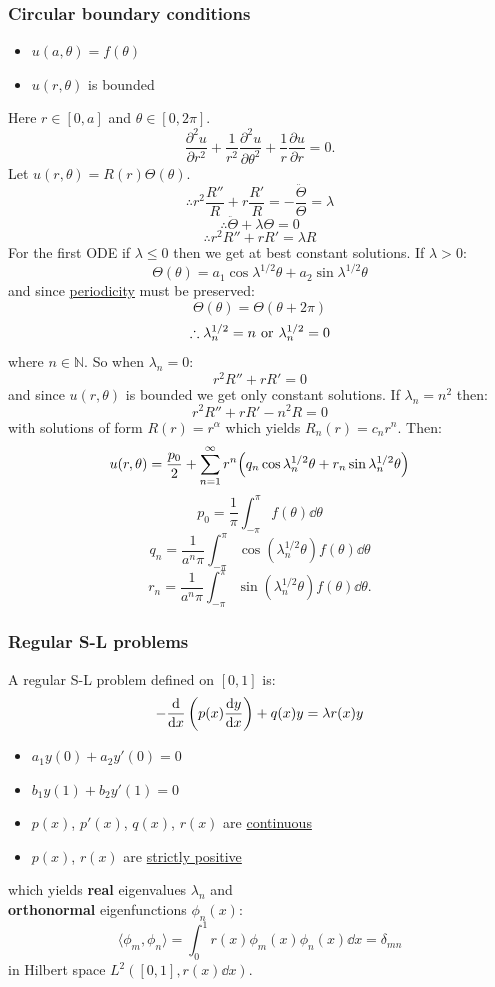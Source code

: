 \documentclass{article}
\begin{document}
\begin{multicols}{3}
\subsubsection*{Circular boundary conditions}
\begin{itemize}
    \item $u(a,\theta)=f(\theta)$
    \item $u(r,\theta)$ is bounded
\end{itemize}
Here $r\in[0,a]$ and $\theta\in[0,2\pi]$.
$$\frac{\partial^2 u}{\partial r^2}+\frac{1}{r^2}\frac{\partial^2 u}{\partial\theta^2}
+\frac{1}{r}\frac{\partial u}{\partial r}=0.$$
Let $u(r,\theta)=R(r)\Theta(\theta)$.
$$\therefore r^2\frac{R''}{R}+r\frac{R'}{R}=-\frac{\ddot{\Theta}}{\Theta}=\lambda$$
$$\therefore\ddot{\Theta}+\lambda\Theta=0$$
$$\therefore r^2 R''+rR'=\lambda R$$
For the first ODE if $\lambda\leq0$ then we get
at best constant solutions. If $\lambda>0$:
$$\Theta(\theta)=a_1\cos\lambda^{1/2}\theta
+a_2\sin\lambda^{1/2}\theta$$
and since \underline{periodicity} must be preserved:
$$\Theta(\theta)=\Theta(\theta+2\pi)$$
$$\therefore\lambda_n^{1/2}=n
\hspace{0.05in}\text{or}\hspace{0.05in}
\lambda_n^{1/2}=0$$
where $n\in\mathbb{N}$. So when $\lambda_n=0$:
$$r^2 R''+rR'=0$$
and since $u(r,\theta)$ is bounded we get only constant solutions.
If $\lambda_n=n^2$ then:
$$r^2 R''+rR'-n^2 R=0$$
with solutions of form $R(r)=r^{\alpha}$ which yields
$R_n(r)=c_n r^n$. Then:
$$u(r,\theta)=\frac{p_0}{2}+\sum_{n=1}^{\infty}
r^n\Bigl(q_n\cos\lambda_n^{1/2}\theta
+r_n\sin\lambda_n^{1/2}\theta\Bigr)$$
$$p_0=\frac{1}{\pi}\int_{-\pi}^{\pi}f(\theta)\dd\theta$$
$$q_n=\frac{1}{a^n\pi}\int_{-\pi}^{\pi}
\cos(\lambda_n^{1/2}\theta)f(\theta)\dd\theta$$
$$r_n=\frac{1}{a^n\pi}\int_{-\pi}^{\pi}
\sin(\lambda_n^{1/2}\theta)f(\theta)\dd\theta.$$

\subsubsection*{Regular S-L problems}
A regular S-L problem defined on $[0,1]$ is:
$$-\dv{x}\left(p(x)\dv{y}{x}\right)+q(x)y=\lambda r(x)y$$
\begin{itemize}
    \item $a_1 y(0)+a_2 y'(0)=0$
    \item $b_1 y(1)+b_2 y'(1)=0$
    \item $p(x)$, $p'(x)$, $q(x)$, $r(x)$ are \underline{continuous}
    \item $p(x)$, $r(x)$ are \underline{strictly positive}
\end{itemize}
which yields \textbf{real} eigenvalues $\lambda_n$
and \\ \textbf{orthonormal} eigenfunctions $\phi_n(x)$:
$$\langle \phi_m,\phi_n \rangle
=\int_{0}^{1}r(x)\phi_m(x)\phi_n(x) \dd x=\delta_{mn}$$
in Hilbert space $L^2([0,1],r(x)\dd x)$.


\end{multicols}
\end{document}
